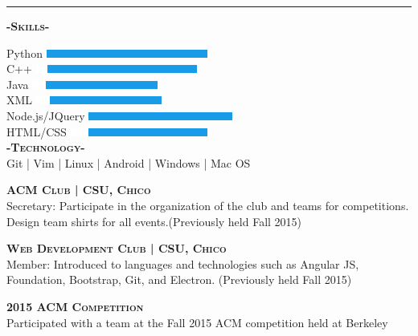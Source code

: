 \documentclass[12pt]{article}
\begin{document}
\noindent\rule{19cm}{0.4pt}
\bigskip
\begin{multicols}{2}
\begin{center}
\textbf{\textsc{-Skills-}}

\begin{small}
\end{small}
\flushleft
Python
\hfill
\includegraphics{C++Skill}\\
\smallskip
C++
\hfill
\includegraphics{PythonSkill}\\
\smallskip
Java
\hfill
\includegraphics{JavaSkill}\\
\smallskip
XML
\hfill
\includegraphics{JavaSkill}\\
\smallskip
Node.js/JQuery
\hfill
\includegraphics{JSSkill}\\
\smallskip
HTML/CSS
\hfill
\includegraphics{HTMLSkill}\\
\center
\textbf{\textsc{-Technology-}}\\
\smallskip
Git | Vim | Linux | Android | Windows | Mac OS

\end{center}

\columnbreak


\center
\footnotesize
\color{black}\textsc{\textbf{ACM Club | CSU, Chico}}\\
\flushleft
\color{Cerulean}Secretary: \color{gray} Participate in the organization of the club and teams for competitions. Design team shirts for all events.(Previously held Fall 2015)

\center
\color{black}\textsc{\textbf{Web Development Club | CSU, Chico}}\\
\flushleft
\color{Cerulean}Member: \color{gray}Introduced to languages and technologies such as Angular JS, Foundation, Bootstrap, Git, and Electron. (Previously held Fall 2015)

\center
\color{black}
\textbf{\textsc{2015 ACM Competition}}\\
\medskip
\color{gray}Participated with a team at the Fall 2015 ACM competition held at Berkeley\color{black}


\end{multicols}
\end{document}
